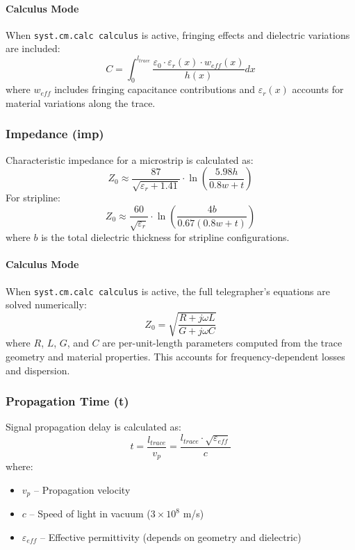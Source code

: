 \documentclass{report}
\begin{document}
\paragraph{Calculus Mode}
When \texttt{syst.cm.calc calculus} is active, fringing effects and dielectric variations are included:
\begin{equation}
C = \int_0^{l_{trace}} \frac{\varepsilon_0 \cdot \varepsilon_r(x) \cdot w_{eff}(x)}{h(x)} dx
\end{equation}
where $w_{eff}$ includes fringing capacitance contributions and $\varepsilon_r(x)$ accounts for material variations along the trace.

\subsubsection{Impedance (imp)}
Characteristic impedance for a microstrip is calculated as:
\begin{equation}
Z_0 \approx \frac{87}{\sqrt{\varepsilon_r + 1.41}} \cdot \ln\left(\frac{5.98h}{0.8w + t}\right)
\end{equation}
For stripline:
\begin{equation}
Z_0 \approx \frac{60}{\sqrt{\varepsilon_r}} \cdot \ln\left(\frac{4b}{0.67(0.8w + t)}\right)
\end{equation}
where $b$ is the total dielectric thickness for stripline configurations.

\paragraph{Calculus Mode}
When \texttt{syst.cm.calc calculus} is active, the full telegrapher's equations are solved numerically:
\begin{equation}
Z_0 = \sqrt{\frac{R + j\omega L}{G + j\omega C}}
\end{equation}
where $R$, $L$, $G$, and $C$ are per-unit-length parameters computed from the trace geometry and material properties. This accounts for frequency-dependent losses and dispersion.

\subsubsection{Propagation Time (t)}
Signal propagation delay is calculated as:
\begin{equation}
t = \frac{l_{trace}}{v_p} = \frac{l_{trace} \cdot \sqrt{\varepsilon_{eff}}}{c}
\end{equation}
where:
\begin{itemize}
\item $v_p$ -- Propagation velocity
\item $c$ -- Speed of light in vacuum ($3 \times 10^8$ m/s)
\item $\varepsilon_{eff}$ -- Effective permittivity (depends on geometry and dielectric)
\end{itemize}
\end{document}
